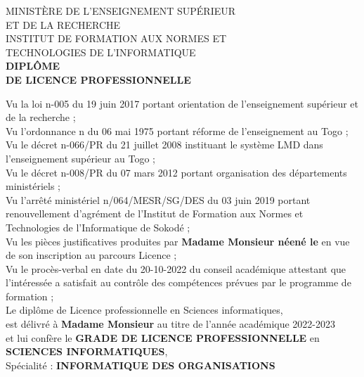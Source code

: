\documentclass[a4paper, landscape, 10pt]{article}
\date{}
\newcommand\BackgroundPic{
\put(-4,0){
\parbox[b][\paperheight]{\paperwidth}{
\texttt{[image: fond\_diplome\_haut]}
}}}
\begin{document}

\AddToShipoutPicture*{\BackgroundPic}

\vspace{-4.5cm}

\begin{center}
\large
MINISTÈRE DE L'ENSEIGNEMENT SUPÉRIEUR\\
ET DE LA RECHERCHE\\
\vspace{0.5cm}
INSTITUT DE FORMATION AUX NORMES ET\\
TECHNOLOGIES DE L'INFORMATIQUE\\
\vspace{0.5cm}
\LARGE
\textbf{DIPLÔME\\
DE LICENCE PROFESSIONNELLE}\\
\end{center}
\vspace{0.5cm}
\noindent
Vu la loi n-005 du 19 juin 2017 portant orientation de l’enseignement supérieur et de la recherche ;\\
Vu l’ordonnance n du 06 mai 1975 portant réforme de l’enseignement au Togo ;\\
Vu le décret n-066/PR du 21 juillet 2008 instituant le système LMD dans l’enseignement supérieur au Togo ;\\
Vu le décret n-008/PR du 07 mars 2012 portant organisation des départements ministériels ;\\
Vu l'arrêté ministériel n/064/MESR/SG/DES du 03 juin 2019 portant renouvellement d'agrément de l'Institut de Formation aux Normes et Technologies de l’Informatique de Sokodé ;\\
Vu les pièces justificatives produites par \textbf{Madame Monsieur néené le } en vue de son inscription au parcours Licence ;\\
Vu le procès-verbal en date du 20-10-2022 \hspace{0.15cm}du conseil académique attestant que l'intéressée a satisfait au contrôle des compétences prévues par le programme de formation ;\\

\noindent
Le diplôme de Licence professionnelle en Sciences informatiques,\\
est délivré à \textbf{Madame Monsieur  } au titre de l'année académique 2022-2023\\
et lui confère le \textbf{GRADE DE LICENCE PROFESSIONNELLE} en \textbf{SCIENCES INFORMATIQUES},\\
Spécialité : \textbf{INFORMATIQUE DES ORGANISATIONS}\\
\end{document}
